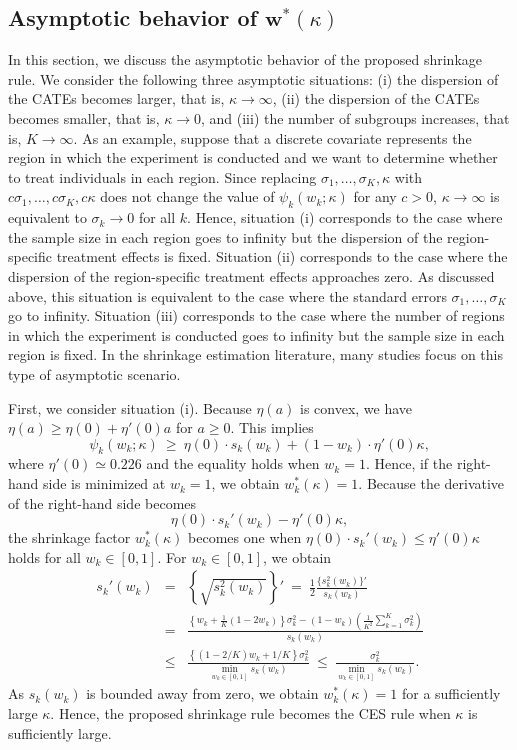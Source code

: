 \documentclass[12pt,a4paper]{article}
\begin{document}
\subsection{Asymptotic behavior of $\bm{w}^{\ast}(\kappa)$}\label{SubSec:asymptotic}
In this section, we discuss the asymptotic behavior of the proposed shrinkage rule. We consider the following three asymptotic situations: (i) the dispersion of the CATEs becomes larger, that is, $\kappa \to \infty$, (ii) the dispersion of the CATEs becomes smaller, that is, $\kappa \to 0$, and (iii) the number of subgroups increases, that is, $K \rightarrow \infty$. As an example, suppose that a discrete covariate represents the region in which the experiment is conducted and we want to determine whether to treat individuals in each region. Since replacing $\sigma_1, \ldots, \sigma_K, \kappa$ with $c\sigma_1, \ldots, c\sigma_K, c\kappa$ does not change the value of $\psi_k(w_k;\kappa)$ for any $c > 0$, $\kappa \to \infty$ is equivalent to $\sigma_k \to 0$ for all $k$. Hence, situation (i) corresponds to the case where the sample size in each region goes to infinity but the dispersion of the region-specific treatment effects is fixed. Situation (ii) corresponds to the case where the dispersion of the region-specific treatment effects approaches zero. As discussed above, this situation is equivalent to the case where the standard errors $\sigma_1, \ldots, \sigma_K$ go to infinity. Situation (iii) corresponds to the case where the number of regions in which the experiment is conducted goes to infinity but the sample size in each region is fixed. In the shrinkage estimation literature, many studies focus on this type of asymptotic scenario.

First, we consider situation (i). Because $\eta(a)$ is convex, we have $\eta(a) \geq \eta(0) + \eta'(0) a$ for $a \geq 0$. This implies
\[
\psi_k(w_k;\kappa) \ \geq \ \eta(0) \cdot s_k(w_k) + (1-w_k) \cdot \eta'(0) \kappa,
\]
where $\eta'(0) \simeq 0.226$ and the equality holds when $w_k = 1$. Hence, if the right-hand side is minimized at $w_k = 1$, we obtain $w_k^{\ast}(\kappa)=1$. Because the derivative of the right-hand side becomes
\[
\eta(0) \cdot s_k'(w_k) - \eta'(0) \kappa,
\]
the shrinkage factor $w_k^{\ast}(\kappa)$ becomes one when $\eta(0) \cdot s_k'(w_k) \leq \eta'(0) \kappa$ holds for all $w_k \in [0,1]$. For $w_k \in [0,1]$, we obtain
\begin{eqnarray*}
s_k'(w_k) &=& \left\{ \sqrt{s_k^2(w_k)} \right\}' \ = \ \frac{1}{2} \frac{\{s_k^2(w_k)\}'}{s_k(w_k)} \\
&=& \frac{\left\{ w_k + \frac{1}{K}(1-2w_k) \right\}\sigma_k^2 - (1-w_k) \left( \frac{1}{K^2} \sum_{k=1}^K \sigma_k^2 \right) }{s_k(w_k)} \\
&\leq & \frac{\left\{ (1-2/K)w_k + 1/K \right\} \sigma_k^2}{\min_{w_k \in [0,1]} s_k(w_k)} \ \leq \ \frac{\sigma_k^2}{\min_{w_k \in [0,1]} s_k(w_k)}.
\end{eqnarray*}
As $s_k(w_k)$ is bounded away from zero, we obtain $w_k^{\ast}(\kappa)=1$ for a sufficiently large $\kappa$. Hence, the proposed shrinkage rule becomes the CES rule when $\kappa$ is sufficiently large.
\end{document}
